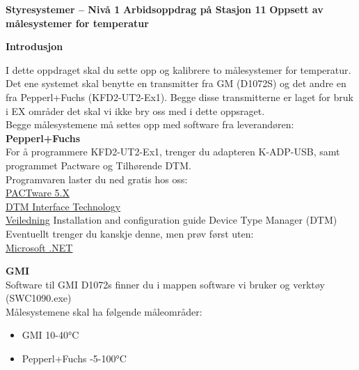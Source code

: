 

\noindent

\vskip 5pt

\vskip 5pt
\begin{center}
\textbf{Styresystemer -- Nivå 1 }
\vskip 5pt 
\textbf{Arbidsoppdrag på Stasjon 11}
\vskip 5pt 
\textbf{Oppsett av målesystemer for temperatur}
\end{center}

\textbf{Introdusjon}

\vskip 5pt 
I dette oppdraget skal du sette opp og kalibrere to målesystemer for temperatur. Det ene systemet skal benytte en transmitter fra GM (D1072S) og det andre en fra Pepperl+Fuchs (KFD2-UT2-Ex1). Begge disse transmitterne er laget for bruk i EX områder det skal vi ikke bry oss med i dette oppsraget. 
\\
Begge målesystemene må settes opp med software fra leverandøren:
\\
\textbf{Pepperl+Fuchs}
\\
For å programmere KFD2-UT2-Ex1, trenger du adapteren K-ADP-USB, samt programmet Pactware og Tilhørende DTM.
\\

Programvaren laster du ned gratis hos oss:
\\
\href {https://www.pepperl-fuchs.com/norway/no/classid_163.htm?view=productdetails&prodid=83574#software}{PACTware 5.X}
\\
\href {https://www.pepperl-fuchs.com/norway/no/classid_1804.htm?view=productdetails&prodid=32802}{DTM Interface Technology}
\\
 

\href{https://files.pepperl-fuchs.com/webcat/navi/productInfo/doct/tdoct1599c_eng.pdf?v=20200320004907}{Veiledning} Installation and configuration guide Device Type Manager (DTM)
\\  
Eventuellt trenger du kanskje denne, men prøv først uten:
\\
\href {https://www.pepperl-fuchs.com/norway/no/classid_1805.htm?view=productdetails&prodid=27434}{Microsoft .NET}


\vskip 5pt 

\textbf{GMI}
\\
Software til GMI D1072s finner du i mappen software vi bruker og verktøy (SWC1090.exe)
\\
Målesystemene skal ha følgende måleområder:
\begin{itemize}[noitemsep]
\item GMI 10-40°C
\item Pepperl+Fuchs -5-100°C
\end{itemize}

